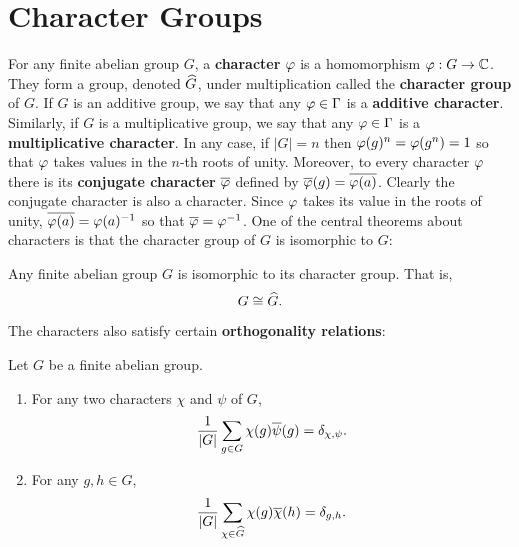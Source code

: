   \section{Character Groups}\label{append:Character_Groups}
    For any finite abelian group $G$, a \textbf{character} $\varphi$ is a homomorphism $\varphi:G \to \mathbb{C}$. They form a group, denoted $\widehat{G}$, under multiplication called the \textbf{character group} of $G$. If $G$ is an additive group, we say that any $\varphi \in \Gamma$ is a \textbf{additive character}. Similarly, if $G$ is a multiplicative group, we say that any $\varphi \in \Gamma$ is a \textbf{multiplicative character}. In any case, if $|G| = n$ then $\varphi(g)^{n} = \varphi(g^{n}) = 1$ so that $\varphi$ takes values in the $n$-th roots of unity. Moreover, to every character $\varphi$ there is its \textbf{conjugate character} $\overline{\varphi}$ defined by $\overline{\varphi}(g) = \overline{\varphi(a)}$. Clearly the conjugate character is also a character. Since $\varphi$ takes its value in the roots of unity, $\overline{\varphi(a)} = \varphi(a)^{-1}$ so that $\overline{\varphi} = \varphi^{-1}$. One of the central theorems about characters is that the character group of $G$ is isomorphic to $G$:

    \begin{proposition}\label{prop:character_group_isomorphim}
      Any finite abelian group $G$ is isomorphic to its character group. That is,
      \[
        G \cong \widehat{G}.
      \]
    \end{proposition}

    The characters also satisfy certain \textbf{orthogonality relations}:

    \begin{proposition*}
      Let $G$ be a finite abelian group.
      \begin{enumerate}[label=(\roman*)]
        \item For any two characters $\chi$ and $\psi$ of $G$,
        \[
          \frac{1}{|G|}\sum_{g \in G}\chi(g)\overline{\psi}(g) = \delta_{\chi,\psi}.
        \]
        \item For any $g,h \in G$,
        \[
          \frac{1}{|G|}\sum_{\chi \in \widehat{G}}\chi(g)\overline{\chi}(h) = \delta_{g,h}.
        \]
      \end{enumerate}
    \end{proposition*}
